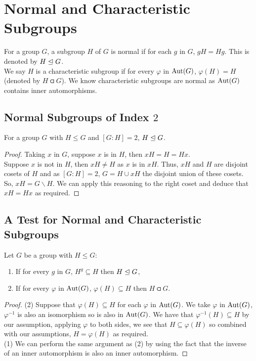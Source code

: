 \section{Normal and Characteristic Subgroups}

For a group $G$, a subgroup $H$ of $G$ is normal if for each $g$ in $G$,
$gH = Hg$. This is denoted by $H \trianglelefteq G$.
\\[\baselineskip]
We say $H$ is a characteristic subgroup if for every $\varphi$ in $\operatorname{Aut}(G)$,
$\varphi(H) = H$ (denoted by $H \csub G$). We know characteristic subgroups
are normal as $\operatorname{Aut}(G)$ contains inner automorphisms.

\subsection{Normal Subgroups of Index $2$}

For a group $G$ with $H \leq G$ and $[G : H] = 2$, $H \trianglelefteq G$.

\begin{proof}
    Taking $x$ in $G$, suppose $x$ is in $H$, then $xH = H = Hx$.
    \\[\baselineskip]
    Suppose $x$ is not in $H$, then $xH \neq H$ as $x$ is in $xH$.
    Thus, $xH$ and $H$ are disjoint cosets of $H$ and as $[G : H] = 2$, 
    $G = H \cup xH$ the disjoint union of these cosets. So, 
    $xH = G \backslash H$. We can apply this reasoning to the right coset
    and deduce that $xH = Hx$ as required.
\end{proof}

\subsection{A Test for Normal and Characteristic Subgroups}

Let $G$ be a group with $H \leq G$: \begin{enumerate}
    \item If for every $g$ in $G$, $H^g \subseteq H$ then $H \trianglelefteq G$,
    \item If for every $\varphi$ in $\operatorname{Aut}(G)$, $\varphi(H) \subseteq H$ 
        then $H \csub G$.
\end{enumerate}

\begin{proof}
    (2) Suppose that $\varphi(H) \subseteq H$ for each $\varphi$ in $\operatorname{Aut}(G)$.
    We take $\varphi$ in $\operatorname{Aut}(G)$, $\varphi^{-1}$ is also an isomorphism
    so is also in $\operatorname{Aut}(G)$. We have that $\varphi^{-1}(H) \subseteq H$
    by our assumption, applying $\varphi$ to both sides, we see that
    $H \subseteq \varphi(H)$ so combined with our assumptions, 
    $H = \varphi(H)$ as required.
    \\[\baselineskip]
    (1) We can perform the same argument as (2) by using the fact that the
    inverse of an inner automorphism is also an inner automorphism.
\end{proof}

